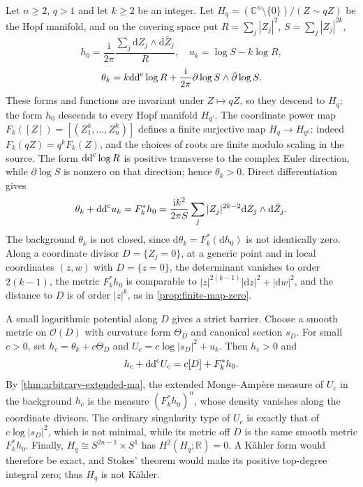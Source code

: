 \begin{example}\label{ex:hopf-zero}
Let $n\geq2$, $q>1$ and let $k\geq2$ be an integer. Let $H_q=(\mathbb C^n\setminus\{0\})/(Z\sim qZ)$ be the Hopf manifold, and on the covering space put $R=\sum_j|Z_j|^2$, $S=\sum_j|Z_j|^{2k}$,
\[
 h_0=\frac{\mathrm{i}}{2\pi}\frac{\sum_j\mathrm{d} Z_j\wedge\mathrm{d}\bar Z_j}{R},
 \quad u_k=\log S-k\log R,
\]
\[
 \theta_k=k\mathrm{dd}^{\mathrm{c}}\log R+
  \frac{\mathrm{i}}{2\pi}\partial\log S\wedge\bar\partial\log S.
\]
These forms and functions are invariant under $Z\mapsto qZ$, so they descend to $H_q$; the form $h_0$ descends to every Hopf manifold $H_{q'}$. The coordinate power map $F_k([Z])=[(Z_1^k,\ldots,Z_n^k)]$ defines a finite surjective map $H_q\to H_{q^k}$: indeed $F_k(qZ)=q^kF_k(Z)$, and the choices of roots are finite modulo scaling in the source. The form $\mathrm{dd}^{\mathrm{c}}\log R$ is positive transverse to the complex Euler direction, while $\partial\log S$ is nonzero on that direction; hence $\theta_k>0$. Direct differentiation gives
\begin{equation}\label{eq:hopf-pullback}
 \theta_k+\mathrm{dd}^{\mathrm{c}} u_k=F_k^*h_0
 =\frac{\mathrm{i} k^2}{2\pi S}\sum_j|Z_j|^{2k-2}\mathrm{d} Z_j\wedge\mathrm{d}\bar Z_j.
\end{equation}
The background $\theta_k$ is not closed, since $\mathrm{d}\theta_k=F_k^*(\mathrm{d} h_0)$ is not identically zero. Along a coordinate divisor $D=\{Z_j=0\}$, at a generic point and in local coordinates $(z,w)$ with $D=\{z=0\}$, the determinant vanishes to order $2(k-1)$, the metric $F_k^*h_0$ is comparable to $|z|^{2(k-1)}|\mathrm{d} z|^2+|\mathrm{d} w|^2$, and the distance to $D$ is of order $|z|^k$, as in \cref{prop:finite-map-zero}.

A small logarithmic potential along $D$ gives a strict barrier. Choose a smooth metric on $\mathcal O(D)$ with curvature form $\Theta_D$ and canonical section $s_D$. For small $c>0$, set $h_c=\theta_k+c\Theta_D$ and $U_c=c\log|s_D|^2+u_k$. Then $h_c>0$ and
\[
 h_c+\mathrm{dd}^{\mathrm{c}} U_c=c[D]+F_k^*h_0.
\]
By \cref{thm:arbitrary-extended-ma}, the extended Monge--Amp\`ere measure of $U_c$ in the background $h_c$ is the measure $(F_k^*h_0)^n$, whose density vanishes along the coordinate divisors. The ordinary singularity type of $U_c$ is exactly that of $c\log|s_D|^2$, which is not minimal, while its metric off $D$ is the same smooth metric $F_k^*h_0$. Finally, $H_q\cong S^{2n-1}\times S^1$ has $H^2(H_q;\mathbb R)=0$. A K\"ahler form would therefore be exact, and Stokes' theorem would make its positive top-degree integral zero; thus $H_q$ is not K\"ahler.
\end{example}

